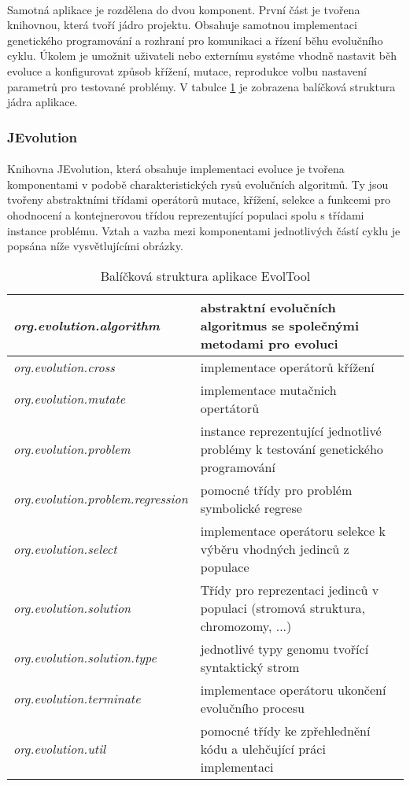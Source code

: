 \documentclass[bc,male,java,dept460]{diploma}		%
\begin{document}
\paragraph*{}
Samotná aplikace je rozdělena do dvou komponent. První část je tvořena knihovnou, která tvoří jádro projektu. Obsahuje samotnou implementaci genetického programování a rozhraní pro komunikaci a řízení běhu evolučního cyklu. Úkolem je umožnit uživateli nebo externímu systéme vhodně nastavit běh evoluce a konfigurovat způsob křížení, mutace, reprodukce volbu nastavení parametrů pro testované problémy. V tabulce \ref{tab:packagetree} je zobrazena balíčková struktura jádra aplikace.

\subsubsection{JEvolution}
\paragraph*{}
Knihovna JEvolution, která obsahuje implementaci evoluce je tvořena komponentami v podobě charakteristických rysů evolučních algoritmů. Ty jsou tvořeny abstraktními třídami operátorů mutace, křížení, selekce a funkcemi pro ohodnocení a kontejnerovou třídou reprezentující populaci spolu s třídami instance problému. Vztah a vazba mezi komponentami jednotlivých částí cyklu je popsána níže vysvětlujícími obrázky.

\begin{table}
  \centering
  \begin{tabular}{| l | p{9cm} |} \hline
    \emph{org.evolution.algorithm} & abstraktní evolučních algoritmus se společnými metodami pro evoluci \\ \hline
    \emph{org.evolution.cross} & implementace operátorů křížení \\ \hline
    \emph{org.evolution.mutate} & implementace mutačnich opertátorů \\ \hline
    \emph{org.evolution.problem} & instance reprezentující jednotlivé problémy k testování genetického programování \\ \hline
    \emph{org.evolution.problem.regression} & pomocné třídy pro problém symbolické regrese  \\ \hline
    \emph{org.evolution.select} & implementace operátoru selekce k výběru vhodných jedinců z populace \\ \hline
    \emph{org.evolution.solution} & Třídy pro reprezentaci jedinců v populaci (stromová struktura, chromozomy, ...) \\ \hline
    \emph{org.evolution.solution.type} & jednotlivé typy genomu tvořící syntaktický strom \\ \hline
    \emph{org.evolution.terminate} & implementace operátoru ukončení evolučního procesu \\ \hline
    \emph{org.evolution.util} & pomocné třídy ke zpřehlednění kódu a ulehčující práci implementaci \\ \hline
  \end{tabular}
  \label{tab:packagetree}
  \caption{Balíčková struktura aplikace EvolTool}
\end{table}
\end{document}
